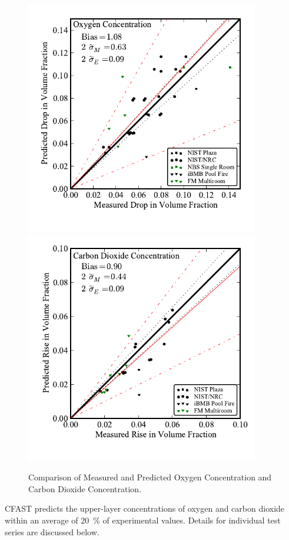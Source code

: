 \begin{figure}
\begin{center}
\includegraphics[width=4.0in]{FIGURES/ScatterPlots/Oxygen_Concentration}  \\
\includegraphics[width=4.0in]{FIGURES/ScatterPlots/Carbon_Dioxide_Concentration}  \\
\end{center}
\caption{Comparison of Measured and Predicted Oxygen Concentration and Carbon Dioxide Concentration.} \label{fig:Species_Scatter}
\end{figure}

CFAST predicts the upper-layer concentrations of oxygen and carbon dioxide within an average of 20~\% of experimental values. Details for individual test series are discussed below. 

